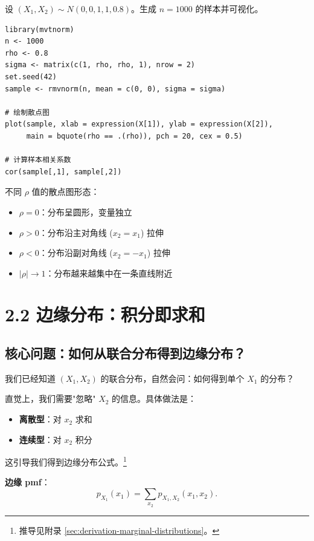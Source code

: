 \begin{example}[生成二元正态样本]\label{ex:bivariate-normal-simulation-ch2}
设 $(X_1, X_2) \sim N(0, 0, 1, 1, 0.8)$。生成 $n = 1000$ 的样本并可视化。

\begin{verbatim}
library(mvtnorm)
n <- 1000
rho <- 0.8
sigma <- matrix(c(1, rho, rho, 1), nrow = 2)
set.seed(42)
sample <- rmvnorm(n, mean = c(0, 0), sigma = sigma)

# 绘制散点图
plot(sample, xlab = expression(X[1]), ylab = expression(X[2]),
     main = bquote(rho == .(rho)), pch = 20, cex = 0.5)

# 计算样本相关系数
cor(sample[,1], sample[,2])
\end{verbatim}
\end{example}

不同 $\rho$ 值的散点图形态：
\begin{itemize}
\item $\rho = 0$：分布呈圆形，变量独立
\item $\rho > 0$：分布沿主对角线 ($x_2 = x_1$) 拉伸
\item $\rho < 0$：分布沿副对角线 ($x_2 = -x_1$) 拉伸
\item $|\rho| \to 1$：分布越来越集中在一条直线附近
\end{itemize}

\section{2.2 边缘分布：积分即求和}\label{sec:2.2}

\subsection{核心问题：如何从联合分布得到边缘分布？}

我们已经知道 $(X_1, X_2)$ 的联合分布，自然会问：如何得到单个 $X_1$ 的分布？

直觉上，我们需要"忽略" $X_2$ 的信息。具体做法是：
\begin{itemize}
\item \textbf{离散型}：对 $x_2$ 求和
\item \textbf{连续型}：对 $x_2$ 积分
\end{itemize}

这引导我们得到边缘分布公式。\footnote{推导见附录 \cref{sec:derivation-marginal-distributions}。}

\textbf{边缘 pmf}：
\begin{equation}\label{eq:marginal-pmf-ch2}
p_{X_1}(x_1) = \sum_{x_2} p_{X_1, X_2}(x_1, x_2).
\end{equation}

